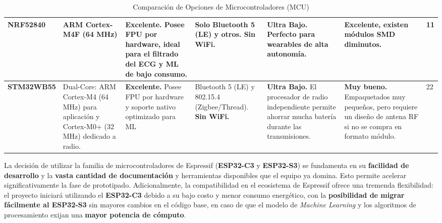 \documentclass[letterpaper,11pt]{article}
\begin{document}
\begin{table}[H]
\begin{tabular}{|L{2.5 cm}|L{2.5 cm}|L{2.5 cm}|L{2 cm}|L{2 cm}|L{2 cm}|L{1.7 cm}|}
        \textbf{NRF52840} \citep{nrf52840_ds}                                                                                  & ARM Cortex-M4F (64 MHz)              & \textbf{Excelente.} Posee FPU por hardware, ideal para el filtrado del ECG y ML de bajo consumo.             & Solo Bluetooth 5 (LE) y otros. \textbf{Sin WiFi.} & \textbf{Ultra Bajo.} Perfecto para wearables de alta autonomía.                         & Excelente, existen módulos SMD diminutos.                  & 11                   \\ \hline

        \textbf{STM32WB55} \citep{stm32wb55_ds}                                                                                &
        Dual-Core: ARM Cortex-M4 (64 MHz) para aplicación y Cortex-M0+ (32 MHz) dedicado a radio.                              &
        \textbf{Excelente.} Posee FPU por hardware y soporte nativo optimizado para ML                                         &
        Bluetooth 5 (LE) y 802.15.4 (Zigbee/Thread). \textbf{Sin WiFi.}                                                        &
        \textbf{Ultra Bajo.} El procesador de radio independiente permite ahorrar mucha batería durante las transmisiones.     &
        \textbf{Muy bueno.} Empaquetados muy pequeños, pero requiere un diseño de antena RF si no se compra en formato módulo. &
        22                                                                                                                                                                                                                                                                                                                                                                                                                                                                                                             \\ \hline
    \end{tabular}
    \caption{Comparación de Opciones de Microcontroladores (MCU)}
    \label{tab:mcu_comparison}
\end{table}

La decisión de utilizar la familia de microcontroladores de Espressif (\textbf{ESP32-C3} y \textbf{ESP32-S3}) se fundamenta en su \textbf{facilidad de desarrollo} y la \textbf{vasta cantidad de documentación} y herramientas disponibles que el equipo ya domina. Esto permite acelerar significativamente la fase de prototipado. Adicionalmente, la compatibilidad en el ecosistema de Espressif ofrece una tremenda flexibilidad: el proyecto iniciará utilizando el \textbf{ESP32-C3} debido a su bajo costo y menor consumo energético, con la \textbf{posibilidad de migrar fácilmente al ESP32-S3} sin mayores cambios en el código base, en caso de que el modelo de \textit{Machine Learning} y los algoritmos de procesamiento exijan una \textbf{mayor potencia de cómputo}.
\end{document}
